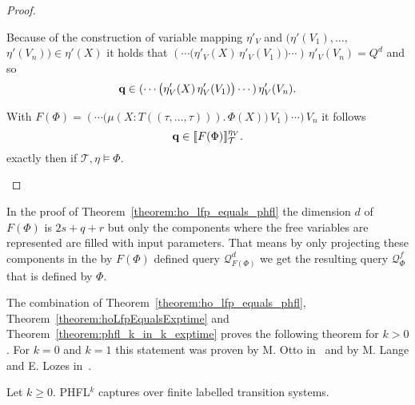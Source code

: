 \begin{proof}
\begin{compactitem}
                Because of the construction of variable mapping $\eta'_V$ and $(\eta'(V_1), \dots, $ $\eta'(V_n)) \in \eta'(X)$ it holds that
        $(\dotsb\big(\eta'_V(X)\,\eta'_V(V_1)\big) \dotsb )\,\eta'_V(V_n) = Q^d$
        and so 
        \begin{align*}
        \emph{q} \in (\dotsb \big(\eta'_V(X)\,\eta'_V(V_1)\big) \dotsb )\,\eta'_V(V_n).
        \end{align*}    

        With $F(\Phi) = (\dotsb \big(\mu (X \colon T((\tau, \dots, \tau))).\,\Phi(X)\big)\,V_1)\dotsb)\,V_n$ it follows
        \[\emph{q} \in \llbracket
         F(\Phi) \rrbracket^{\eta_V}_\mathcal{T}.\]
        exactly then if $\mathcal{T}, \eta \models \Phi$.
    \end{compactitem}
\end{proof}

\begin{remark}
In the proof of Theorem~\ref{theorem:ho_lfp_equals_phfl} the dimension $d$ of $F(\Phi)$ is $2s+q+r$ but only the components where the free variables are represented are filled with input parameters. That means by only projecting these components in the by $F(\Phi)$ defined query $\mathcal{Q}^d_{F(\Phi)}$ we get the resulting query $\mathcal{Q}^f_{\Phi}$ that is defined by $\Phi$. 
\end{remark}

The combination of Theorem~\ref{theorem:ho_lfp_equals_phfl}, Theorem~\ref{theorem:hoLfpEqualsExptime} and 
Theorem~\ref{theorem:phfl_k_in_k_exptime} proves the following theorem for $k>0$. For $k = 0$ and $k = 1$ this statement was proven by M. Otto in~\cite{otto1999bisimulation} and by M. Lange and E. Lozes in~\cite{lange2014capturing}.

\begin{theorem}
    Let $k \geq 0$. PHFL$^k$ captures  over finite labelled transition systems.
\end{theorem}

